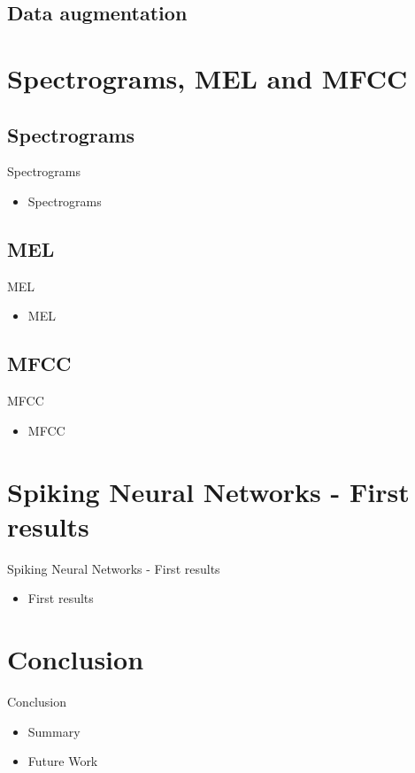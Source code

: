 \documentclass[aspectratio=169, 11pt]{beamer}
\begin{document}
\subsection{Data augmentation}

\section{Spectrograms, MEL and MFCC}
\subsection{Spectrograms}

\begin{frame}{Spectrograms}
  \begin{itemize}
    \item Spectrograms
  \end{itemize}
\end{frame}

\subsection{MEL}

\begin{frame}{MEL}
  \begin{itemize}
    \item MEL
  \end{itemize}
\end{frame}

\subsection{MFCC}

\begin{frame}{MFCC}
  \begin{itemize}
    \item MFCC
  \end{itemize}
\end{frame}

\section{Spiking Neural Networks - First results}

\begin{frame}{Spiking Neural Networks - First results}
  \begin{itemize}
    \item First results
  \end{itemize}
\end{frame}

\section{Conclusion}

\begin{frame}{Conclusion}
  \begin{itemize}
    \item Summary
    \item Future Work
  \end{itemize}
\end{frame}
\end{document}
